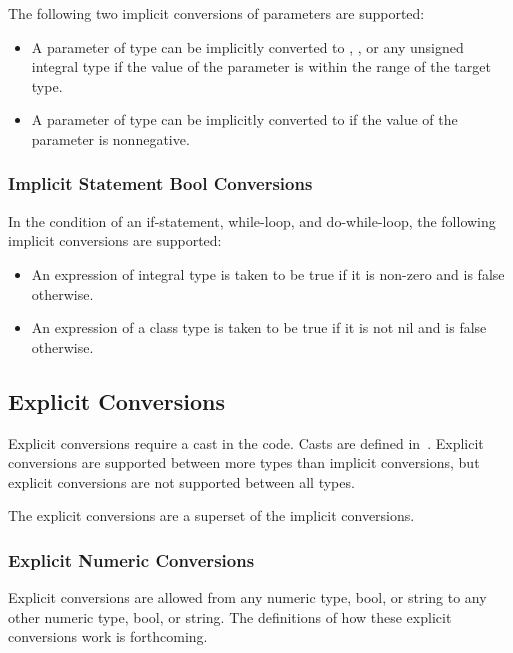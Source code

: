 The following two implicit conversions of parameters are supported:
\begin{itemize}
\item A parameter of type  can be implicitly converted
to , , or any unsigned integral type if the
value of the parameter is within the range of the target type.
\item A parameter of type  can be implicitly converted
to  if the value of the parameter is nonnegative.
\end{itemize}

\subsubsection{Implicit Statement Bool Conversions}
\label{Implicit_Statement_Bool_Conversions}

In the condition of an if-statement, while-loop, and do-while-loop,
the following implicit conversions are supported:
\begin{itemize}
\item An expression of integral type is taken to be true if it is non-zero and is false otherwise.
\item An expression of a class type is taken to be true if it is not nil and is false otherwise.
\end{itemize}

\subsection{Explicit Conversions}
\label{Explicit_Conversions}

Explicit conversions require a cast in the code.  Casts are defined
in~.  Explicit conversions are supported between more
types than implicit conversions, but explicit conversions are not
supported between all types.

The explicit conversions are a superset of the implicit conversions.

\subsubsection{Explicit Numeric Conversions}
\label{Explicit_Numeric_Conversions}

Explicit conversions are allowed from any numeric type, bool, or
string to any other numeric type, bool, or string.  The definitions of
how these explicit conversions work is forthcoming.

